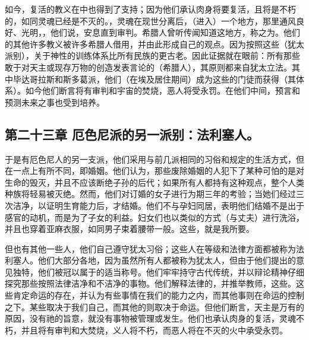 如今，复活的教义在中也得到了支持；因为他们承认肉身将要复活，且将是不朽的，如同灵魂已经是不灭的。，灵魂在现世分离后，（进入）一个地方，那里通风良好、光明，，他们说，安息直到审判。希腊人曾听传闻知道这地方，称之为。他们的其他许多教义被许多希腊人借用，并由此形成自己的观点。因为按照这些（犹太派别），关于神性的训练体系比所有民族的更古老。因此证据就在眼前：所有那些敢于对天主或现存万物的创造发表言论的（希腊人），其原则都来自犹太立法。其中毕达哥拉斯和斯多葛派，他们（在埃及居住期间）成为这些的门徒而获得（其体系）。如今他们断言将有审判和宇宙的焚烧，恶人将受永罚。在他们中间，预言和预测未来之事也受到培养。\par


\subsection{第二十三章 厄色尼派的另一派别：法利塞人。}

于是有厄色尼人的另一支派，他们采用与前几派相同的习俗和规定的生活方式，但在一点上有所不同，即婚姻。他们认为，那些废除婚姻的人犯下了某种可怕的是对生命的毁灭，并且不应该断绝子孙的后代；如果所有人都持有这种观点，整个人类种族将轻易被灭绝。然而，他们对订婚的女子进行为期三年的考验；当她们经过三次洁净，以证明生育能力后，才结婚。他们不与孕妇同居，表明他们结婚不是出于感官的动机，而是为了子女的利益。妇女们也以类似的方式（与丈夫）进行洗浴，并且也穿着亚麻衣服，如同男子束着腰带一般。这些，就是我所要。\par

但也有其他一些人，他们自己遵守犹太习俗；这些人在等级和法律方面都被称为法利塞人。他们大部分各地，因为虽然所有人都被称为犹太人，但由于他们提出的意见独特，他们被冠以属于的适当称号。他们牢牢持守古代传统，并以辩论精神仔细探究那些按照法律洁净和不洁净的事物。他们解释法律的，并推举教师，这些。这些肯定命运的存在，并认为有些事情在我们的能力之内，而其他事则在命运的控制之下。某些取决于我们自己，而其他的则取决于命运。但他们断言，天主是万有的原因，没有祂的旨意，就没有事物被管理或发生。他们也承认肉身的复活，灵魂不朽，并且将有审判和大焚烧，义人将不朽，而恶人将在不灭的火中承受永罚。\par

